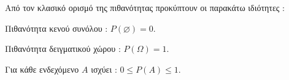 Από τον κλασικό ορισμό της πιθανότητας προκύπτουν οι παρακάτω ιδιότητες :
\begin{rlist}
\item Πιθανότητα κενού συνόλου : $ P(\varnothing)=0 $.
\item Πιθανότητα δειγματικού χώρου : $ P(\varOmega)=1 $.
\item Για κάθε ενδεχόμενο $ A $ ισχύει : $ 0\leq P(A)\leq1 $.
\end{rlist}
